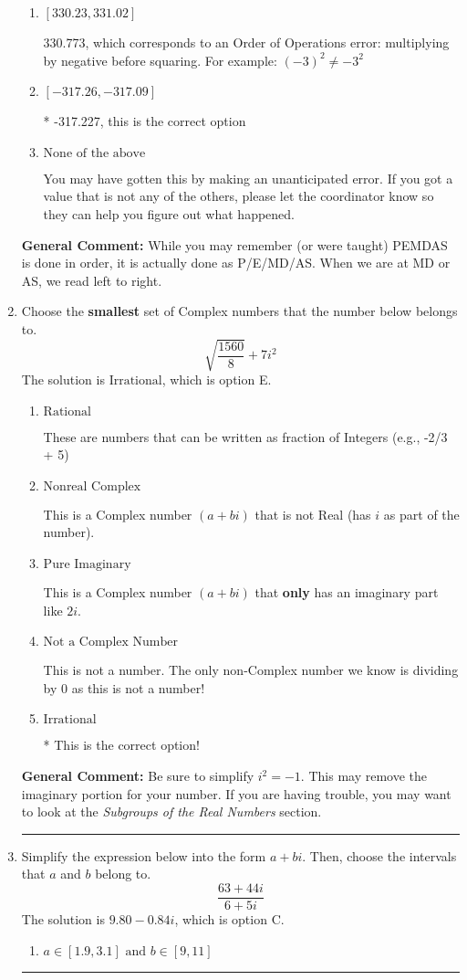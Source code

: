 \documentclass{extbook}[14pt]
\newcommand{\litem}[1]{\item #1

\rule{\textwidth}{0.4pt}}
\begin{document}
\begin{enumerate}
{\begin{enumerate}[label=\Alph*.]
 330.031, which corresponds to two Order of Operations errors.
\item \( [330.23, 331.02] \)

 330.773, which corresponds to an Order of Operations error: multiplying by negative before squaring. For example: $(-3)^2 \neq -3^2$
\item \( [-317.26, -317.09] \)

* -317.227, this is the correct option
\item \( \text{None of the above} \)

 You may have gotten this by making an unanticipated error. If you got a value that is not any of the others, please let the coordinator know so they can help you figure out what happened.
\end{enumerate}

\textbf{General Comment:} While you may remember (or were taught) PEMDAS is done in order, it is actually done as P/E/MD/AS. When we are at MD or AS, we read left to right.
}
\litem{
Choose the \textbf{smallest} set of Complex numbers that the number below belongs to.
\[ \sqrt{\frac{1560}{8}}+7i^2 \]The solution is \( \text{Irrational} \), which is option E.\begin{enumerate}[label=\Alph*.]
\item \( \text{Rational} \)

These are numbers that can be written as fraction of Integers (e.g., -2/3 + 5)
\item \( \text{Nonreal Complex} \)

This is a Complex number $(a+bi)$ that is not Real (has $i$ as part of the number).
\item \( \text{Pure Imaginary} \)

This is a Complex number $(a+bi)$ that \textbf{only} has an imaginary part like $2i$.
\item \( \text{Not a Complex Number} \)

This is not a number. The only non-Complex number we know is dividing by 0 as this is not a number!
\item \( \text{Irrational} \)

* This is the correct option!
\end{enumerate}

\textbf{General Comment:} Be sure to simplify $i^2 = -1$. This may remove the imaginary portion for your number. If you are having trouble, you may want to look at the \textit{Subgroups of the Real Numbers} section.
}
\litem{
Simplify the expression below into the form $a+bi$. Then, choose the intervals that $a$ and $b$ belong to.
\[ \frac{63 + 44 i}{6 + 5 i} \]The solution is \( 9.80  - 0.84 i \), which is option C.\begin{enumerate}[label=\Alph*.]
\item \( a \in [1.9, 3.1] \text{ and } b \in [9, 11] \)


\end{enumerate}}
\end{enumerate}
\end{document}

